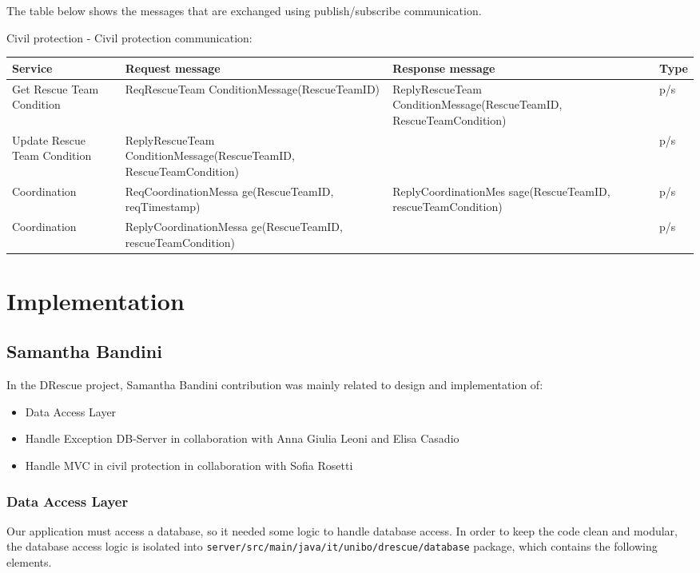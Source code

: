 \documentclass[a4paper,12pt]{report}
\begin{document}
The table below shows the messages that are exchanged using publish/subscribe communication.

Civil protection - Civil protection communication:

\begin{center}
\begin{tabular}{ |p{4cm}|p{4cm}|p{4cm}|p{2cm}| } \hline
Service 			& Request message 	& Response message		& Type 	\\
\hline
Get Rescue Team Condition	& ReqRescueTeam ConditionMessage(RescueTeamID)	& ReplyRescueTeam ConditionMessage(RescueTeamID, RescueTeamCondition) 	& p/s	\\ 
Update Rescue Team Condition	&  ReplyRescueTeam ConditionMessage(RescueTeamID, RescueTeamCondition) 	& 	& p/s	\\ 
Coordination	&  ReqCoordinationMessa ge(RescueTeamID, reqTimestamp) 	& ReplyCoordinationMes
sage(RescueTeamID, rescueTeamCondition)	& p/s	\\
Coordination	&  ReplyCoordinationMessa ge(RescueTeamID, rescueTeamCondition) 	& 	& p/s	\\
\hline
\end{tabular}
\end{center}

\chapter{Implementation}

\section{Samantha Bandini}
In the DRescue project, Samantha Bandini contribution was mainly related to design and implementation of:
\begin{itemize}
\item Data Access Layer 
\item Handle Exception DB-Server in collaboration with Anna Giulia Leoni and Elisa Casadio
\item Handle MVC in civil protection in collaboration with Sofia Rosetti
\end{itemize}

\subsection{Data Access Layer}

Our application must access a database, so it needed some logic to handle database access. In order to keep the code clean and modular, the database access logic is isolated into \texttt{server/src/main/java/it/unibo/drescue/database} package, which contains the following elements.
\end{document}
